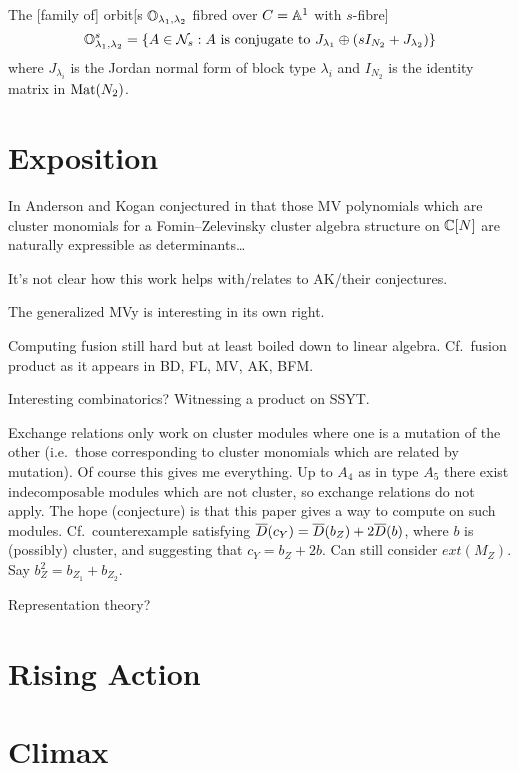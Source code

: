 \documentclass{article}
\begin{document}
The [family of] orbit[s $\OO_{\lambda_1,\lambda_2}$ fibred over $C = \AA^1$ with $s$-fibre]  
\begin{equation}
    \OO_{\lambda_1,\lambda_2}^s = \{A \in \cN_s : A \text{ is conjugate to } J_{\lambda_1}\oplus (sI_{N_2} + J_{\lambda_2})\}
\end{equation}
where $J_{\lambda_i}$ is the Jordan normal form of block type $\lambda_i$ and $I_{N_2}$ is the identity matrix in $\mat(N_2)$.
% 
\section{Exposition}

In Anderson and Kogan conjectured in \cite{anderson2006algebra}  that those MV polynomials which are cluster monomials for a Fomin--Zelevinsky cluster algebra structure on $\CC[N]$ are naturally expressible as determinants\dots

It's not clear how this work helps with/relates to AK/their conjectures.

The generalized MVy is interesting in its own right. 

Computing fusion still hard but at least boiled down to linear algebra. Cf.\ fusion product as it appears in BD, FL, MV, AK, BFM.

Interesting combinatorics? Witnessing a product on SSYT.

Exchange relations only work on cluster modules where one is a mutation of the other (i.e.\ those corresponding to cluster monomials which are related by mutation). Of course this gives me everything. Up to $A_4$ as in type $A_5$ there exist indecomposable modules which are not cluster, so exchange relations do not apply. The hope (conjecture) is that this paper gives a way to compute on such modules. Cf.\ counterexample satisfying $\barD(c_Y) = \barD(b_Z) + 2\barD(b)$, where $b$ is (possibly) cluster, and suggesting that $c_Y = b_Z + 2b$. Can still consider $ext(M_Z)$. Say $b_Z^2 = b_{Z_1} + b_{Z_2}$. 


Representation theory? 

\section{Rising Action} %

\section{Climax}
\end{document}
